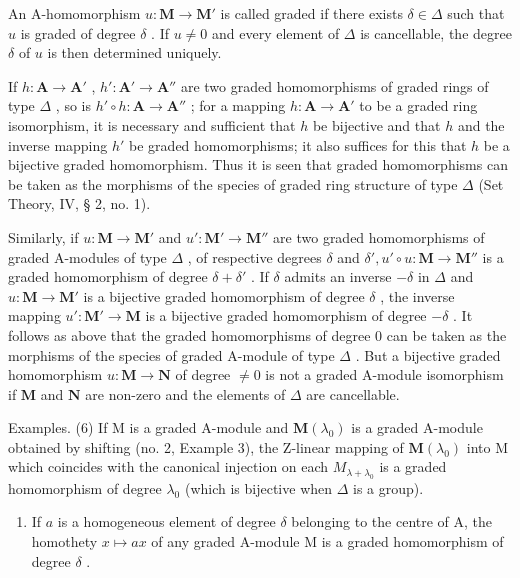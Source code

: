 An A-homomorphism \(u: \mathbf{M} \to \mathbf{M}'\) is called graded if there exists \(\delta \in \Delta\) such that \(u\) is graded of degree \(\delta\) . If \(u \neq 0\) and every element of \(\Delta\) is cancellable, the degree \(\delta\) of \(u\) is then determined uniquely.

If \(h: \mathbf{A} \to \mathbf{A}'\) , \(h': \mathbf{A}' \to \mathbf{A}''\) are two graded homomorphisms of graded rings of type \(\Delta\) , so is \(h' \circ h: \mathbf{A} \to \mathbf{A}''\) ; for a mapping \(h: \mathbf{A} \to \mathbf{A}'\) to be a graded ring isomorphism, it is necessary and sufficient that \(h\) be bijective and that \(h\) and the inverse mapping \(h'\) be graded homomorphisms; it also suffices for this that \(h\) be a bijective graded homomorphism. Thus it is seen that graded homomorphisms can be taken as the morphisms of the species of graded ring structure of type \(\Delta\) (Set Theory, IV, § 2, no. 1).

Similarly, if \(u: \mathbf{M} \to \mathbf{M}'\) and \(u': \mathbf{M}' \to \mathbf{M}''\) are two graded homomorphisms of graded A-modules of type \(\Delta\) , of respective degrees \(\delta\) and \(\delta', u' \circ u: \mathbf{M} \to \mathbf{M}''\) is a graded homomorphism of degree \(\delta + \delta'\) . If \(\delta\) admits an inverse \(-\delta\) in \(\Delta\) and \(u: \mathbf{M} \to \mathbf{M}'\) is a bijective graded homomorphism of degree \(\delta\) , the inverse mapping \(u': \mathbf{M}' \to \mathbf{M}\) is a bijective graded homomorphism of degree \(-\delta\) . It follows as above that the graded homomorphisms of degree 0 can be taken as the morphisms of the species of graded A-module of type \(\Delta\) . But a bijective graded homomorphism \(u: \mathbf{M} \to \mathbf{N}\) of degree \(\neq 0\) is not a graded A-module isomorphism if \(\mathbf{M}\) and \(\mathbf{N}\) are non-zero and the elements of \(\Delta\) are cancellable.

Examples. (6) If M is a graded A-module and \(\mathbf{M}(\lambda_{0})\) is a graded A-module obtained by shifting (no. 2, Example 3), the Z-linear mapping of \(\mathbf{M}(\lambda_{0})\) into M which coincides with the canonical injection on each \(M_{\lambda+\lambda_{0}}\) is a graded homomorphism of degree \(\lambda_{0}\) (which is bijective when \(\Delta\) is a group).

\begin{enumerate}
\def\labelenumi{(\arabic{enumi})}
\setcounter{enumi}{6}
\tightlist
\item
  If \(a\) is a homogeneous element of degree \(\delta\) belonging to the centre of A, the homothety \(x \mapsto ax\) of any graded A-module M is a graded homomorphism of degree \(\delta\) .
\end{enumerate}

